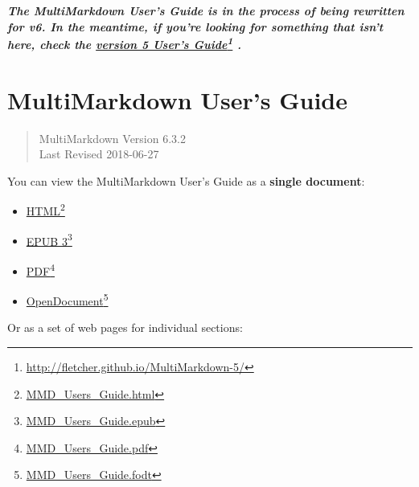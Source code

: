 
\def\mytitle{MultiMarkdown User's Guide}
\def\myauthor{Fletcher T. Penney}
\def\version{6.3.2}
\def\revised{2018-06-27}




\textbf{\emph{The MultiMarkdown User's Guide is in the process of being rewritten for v6. In the meantime, if you're looking for something that isn't here, check the \href{http://fletcher.github.io/MultiMarkdown-5/}{version 5 User's Guide}\footnote{\href{http://fletcher.github.io/MultiMarkdown-5/}{http:\slash \slash fletcher.github.io\slash MultiMarkdown-5\slash }} .}}

\chapter{MultiMarkdown User's Guide }
\label{title}

\begin{quote}
MultiMarkdown Version 6.3.2\\
Last Revised 2018-06-27
\end{quote}

You can view the MultiMarkdown User's Guide as a \textbf{single document}:

\begin{itemize}
\item \href{MMD_Users_Guide.html}{HTML}\footnote{\href{MMD_Users_Guide.html}{MMD\_Users\_Guide.html}}

\item \href{MMD_Users_Guide.epub}{EPUB 3}\footnote{\href{MMD_Users_Guide.epub}{MMD\_Users\_Guide.epub}}

\item \href{MMD_Users_Guide.pdf}{PDF}\footnote{\href{MMD_Users_Guide.pdf}{MMD\_Users\_Guide.pdf}}

\item \href{MMD_Users_Guide.fodt}{OpenDocument}\footnote{\href{MMD_Users_Guide.fodt}{MMD\_Users\_Guide.fodt}}

\end{itemize}

Or as a set of web pages for individual sections:

